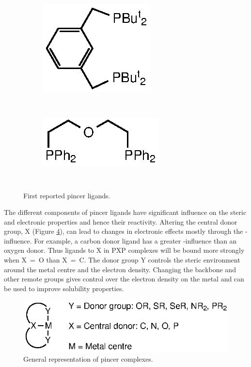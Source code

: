 \begin{figure}[htbp]
\centering
\begin{subfigure}[b]{0.3\textwidth}
	\centering
	\includegraphics{../Figures/Shaw.eps}
	\caption{}
	\label{ShawPCP}
\end{subfigure}
~
\begin{subfigure}[b]{0.3\textwidth}
	\centering
	\includegraphics{../Figures/Alcock.eps}
	\caption{}
	\label{AlcockPOP}
\end{subfigure}
\\
\caption[First reported pincer ligands]{First reported pincer ligands.}
\label{Pincerligands}
\end{figure}

The different components of pincer ligands have significant influence on the steric and electronic properties and hence their reactivity.\cite{Singleton2003}  Altering the central donor group, X (Figure \ref{Pincerligands}), can lead to changes in electronic effects mostly through the \trans{}-influence.\cite{Choi2011}  For example, a carbon donor ligand has a greater \trans{}-influence than an oxygen donor.  Thus ligands \trans{} to X in PXP complexes will be bound more strongly when X~=~O than X~=~C.\cite{Zhu2008} The donor group Y controls the steric environment around the metal centre and the electron density.  Changing the backbone and other remote groups gives control over the electron density on the metal and can be used to improve solubility properties.\cite{Choi2011}

\begin{figure}[htbp]
\centering
\includegraphics{../Figures/Pincerligands.eps}
\caption[General representation of pincer complexes]{General representation of pincer complexes.}
\label{Pincerligands}
\end{figure}

